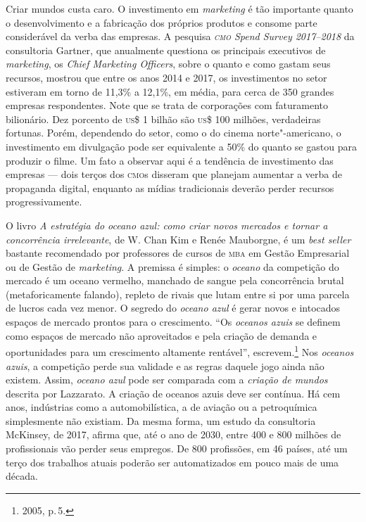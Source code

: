 Criar mundos custa caro. O investimento em \emph{marketing} é tão
importante quanto o desenvolvimento e a fabricação dos próprios produtos
e consome parte considerável da verba das empresas. A pesquisa \emph{\textsc{cmo}
Spend Survey 2017--2018} da consultoria Gartner, que anualmente questiona
os principais executivos de \emph{marketing}, os \emph{Chief Marketing
Officers}, sobre o quanto e como gastam seus recursos, mostrou que entre
os anos 2014 e 2017, os investimentos no setor estiveram em torno de
11,3\% a 12,1\%, em média, para cerca de 350 grandes empresas
respondentes. Note que se trata de corporações com faturamento
bilionário. Dez porcento de \textsc{us}\$ 1 bilhão são \textsc{us}\$ 100 milhões,
verdadeiras fortunas. Porém, dependendo do setor, como o do cinema
norte"-americano, o investimento em divulgação pode ser equivalente a
50\% do quanto se gastou para produzir o filme. Um fato a observar aqui
é a tendência de investimento das empresas --- dois terços dos \textsc{cmo}s
disseram que planejam aumentar a verba de propaganda digital, enquanto
as mídias tradicionais deverão perder recursos progressivamente.

O livro \emph{A estratégia do \emph{oceano azul}: como criar novos mercados e
tornar a concorrência irrelevante}, de W. Chan Kim e Renée Mauborgne, é
um \emph{best seller} bastante recomendado por professores de cursos de
\textsc{mba} em Gestão Empresarial ou de Gestão de \emph{marketing}. A premissa é
simples: o \emph{oceano} da competição do mercado é um oceano vermelho,
manchado de sangue pela concorrência brutal (metaforicamente falando),
repleto de rivais que lutam entre si por uma parcela de lucros cada vez
menor. O segredo do \emph{oceano azul} é gerar novos e intocados espaços de
mercado prontos para o crescimento. ``Os \emph{oceanos azuis} se definem como
espaços de mercado não aproveitados e pela criação de demanda e
oportunidades para um crescimento altamente rentável'', escrevem.\footnote{2005,
p.\,5.} Nos \emph{oceanos azuis}, a competição perde sua validade e as regras
daquele jogo ainda não existem. Assim, \emph{oceano azul} pode ser
comparada com a \emph{criação de mundos} descrita por Lazzarato. A
criação de oceanos azuis deve ser contínua. Há cem anos, indústrias como
a automobilística, a de aviação ou a petroquímica simplesmente não
existiam. Da mesma forma, um estudo da consultoria McKinsey, de 2017,
afirma que, até o ano de 2030, entre 400 e 800 milhões de profissionais
vão perder seus empregos. De 800 profissões, em 46 países, até um terço
dos trabalhos atuais poderão ser automatizados em pouco mais de uma
década.

